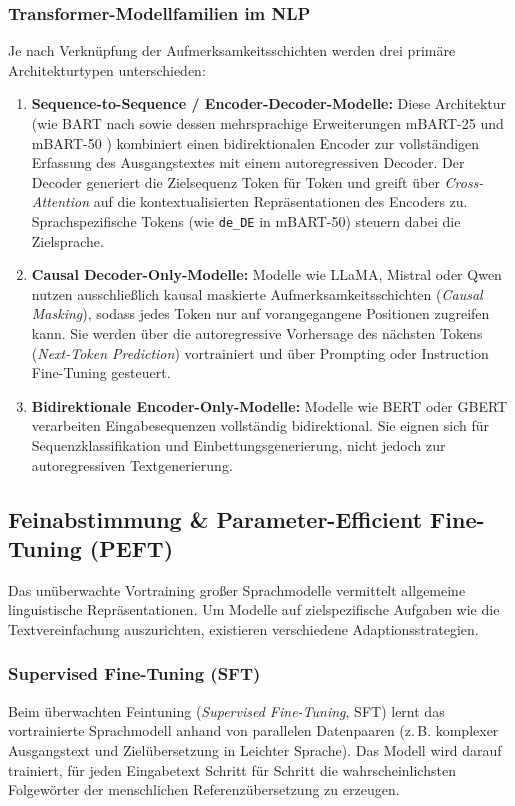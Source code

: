 \subsubsection{Transformer-Modellfamilien im NLP}
Je nach Verknüpfung der Aufmerksamkeitsschichten werden drei primäre Architekturtypen unterschieden:
\begin{enumerate}
    \item \textbf{Sequence-to-Sequence / Encoder-Decoder-Modelle:} Diese Architektur (wie BART nach \citet{lewis2020bart} sowie dessen mehrsprachige Erweiterungen mBART-25 \citep{liu2020multilingual} und mBART-50 \citep{tang2020multilingual}) kombiniert einen bidirektionalen Encoder zur vollständigen Erfassung des Ausgangstextes mit einem autoregressiven Decoder. Der Decoder generiert die Zielsequenz Token für Token und greift über \textit{Cross-Attention} auf die kontextualisierten Repräsentationen des Encoders zu. Sprachspezifische Tokens (wie \texttt{de\_DE} in mBART-50) steuern dabei die Zielsprache.
    \item \textbf{Causal Decoder-Only-Modelle:} Modelle wie LLaMA, Mistral oder Qwen nutzen ausschließlich kausal maskierte Aufmerksamkeitsschichten (\textit{Causal Masking}), sodass jedes Token nur auf vorangegangene Positionen zugreifen kann. Sie werden über die autoregressive Vorhersage des nächsten Tokens (\textit{Next-Token Prediction}) vortrainiert und über Prompting oder Instruction Fine-Tuning gesteuert.
    \item \textbf{Bidirektionale Encoder-Only-Modelle:} Modelle wie BERT \citep{devlin2019bert} oder GBERT verarbeiten Eingabesequenzen vollständig bidirektional. Sie eignen sich für Sequenzklassifikation und Einbettungsgenerierung, nicht jedoch zur autoregressiven Textgenerierung.
\end{enumerate}

\subsection{Feinabstimmung \& Parameter-Efficient Fine-Tuning (PEFT)}
\label{sec:peft_lora_theorie}

Das unüberwachte Vortraining großer Sprachmodelle vermittelt allgemeine linguistische Repräsentationen. Um Modelle auf zielspezifische Aufgaben wie die Textvereinfachung auszurichten, existieren verschiedene Adaptionsstrategien.

\subsubsection{Supervised Fine-Tuning (SFT)}
Beim überwachten Feintuning (\textit{Supervised Fine-Tuning}, SFT) lernt das vortrainierte Sprachmodell anhand von parallelen Datenpaaren (z.\,B. komplexer Ausgangstext und Zielübersetzung in Leichter Sprache). Das Modell wird darauf trainiert, für jeden Eingabetext Schritt für Schritt die wahrscheinlichsten Folgewörter der menschlichen Referenzübersetzung zu erzeugen.

